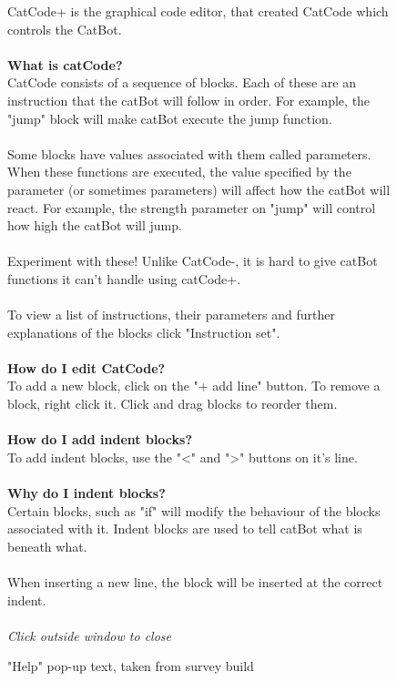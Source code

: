 \begin{figure}[h]
    \centering
    \begin{tcolorbox}[boxrule=0.25mm]
        CatCode+ is the graphical code editor, that created CatCode which controls the CatBot. \\
        \phantom{-} \\
        \textbf{What is catCode?} \\
        CatCode consists of a sequence of blocks. Each of these are an instruction that the catBot will follow in order. For example, the "jump" block will make catBot execute the jump function. \\
        \phantom{-} \\
        Some blocks have values associated with them called parameters. When these functions are executed, the value specified by the parameter (or sometimes parameters) will affect how the catBot will react. For example, the strength parameter on "jump" will control how high the catBot will jump. \\
        \phantom{-} \\
        Experiment with these! Unlike CatCode-, it is hard to give catBot functions it can't handle using catCode+. \\
        \phantom{-} \\
        To view a list of instructions, their parameters and further explanations of the blocks click "Instruction set". \\
        \phantom{-} \\
        \textbf{How do I edit CatCode?} \\
        To add a new block, click on the "+ add line" button. To remove a block, right click it. Click and drag blocks to reorder them. \\
        \phantom{-} \\
        \textbf{How do I add indent blocks?} \\
        To add indent blocks, use the "<" and ">" buttons on it's line. \\
        \phantom{-} \\
        \textbf{Why do I indent blocks?} \\
        Certain blocks, such as "if" will modify the behaviour of the blocks associated with it. Indent blocks are used to tell catBot what is beneath what. \\
        \phantom{-} \\
        When inserting a new line, the block will be inserted at the correct indent. \\
        \phantom{-} \\
        \textit{Click outside window to close}
    \end{tcolorbox}
    \caption[Help pop-up text]{"Help" pop-up text, taken from survey build}
    \label{fig:catCodeSpec/help}
\end{figure}

